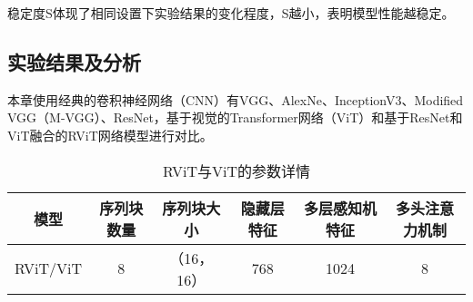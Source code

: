稳定度S体现了相同设置下实验结果的变化程度，S越小，表明模型性能越稳定。

\subsection{实验结果及分析}

本章使用经典的卷积神经网络（CNN）有VGG、AlexNe、InceptionV3、Modified VGG（M-VGG）、ResNet，基于视觉的Transformer网络（ViT）和基于ResNet和ViT融合的RViT网络模型进行对比。

\begin{table}[!ht]
	\caption{RViT与ViT的参数详情}
	\label{表3.2}
	\renewcommand{\arraystretch}{1.5}
	\centering
	\begin{tabular}{cccccc}
		\bottomrule
		模型       & 序列块数量 & 序列块大小   & 隐藏层特征 & 多层感知机特征 & 多头注意力机制 \\ \hline
		RViT/ViT & 8    & （16，16） & 768   & 1024    & 8      \\ 
		\bottomrule
	\end{tabular}
\end{table}

